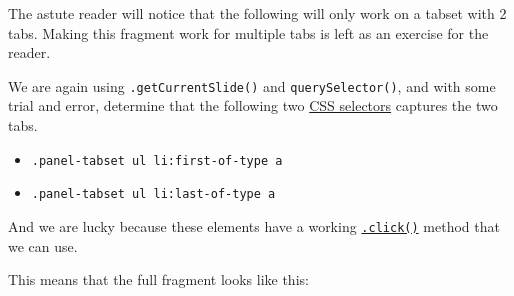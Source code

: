 \documentclass[
  letterpaper,
  DIV=11,
  numbers=noendperiod]{scrreprt}
\providecommand{\tightlist}{%
  \setlength{\itemsep}{0pt}\setlength{\parskip}{0pt}}\usepackage{longtable,booktabs,array}
\begin{document}
\begin{tcolorbox}[enhanced jigsaw, titlerule=0mm, bottomrule=.15mm, opacityback=0, colbacktitle=quarto-callout-note-color!10!white, colframe=quarto-callout-note-color-frame, coltitle=black, breakable, toprule=.15mm, colback=white, bottomtitle=1mm, title=\textcolor{quarto-callout-note-color}{\faInfo}\hspace{0.5em}{Note}, toptitle=1mm, arc=.35mm, left=2mm, leftrule=.75mm, rightrule=.15mm, opacitybacktitle=0.6]

The astute reader will notice that the following will only work on a
tabset with 2 tabs. Making this fragment work for multiple tabs is left
as an exercise for the reader.

\end{tcolorbox}

We are again using \texttt{.getCurrentSlide()} and
\texttt{querySelector()}, and with some trial and error, determine that
the following two
\href{https://www.w3schools.com/cssref/css_selectors.php}{CSS selectors}
captures the two tabs.

\begin{itemize}
\tightlist
\item
  \texttt{.panel-tabset\ ul\ li:first-of-type\ a}
\item
  \texttt{.panel-tabset\ ul\ li:last-of-type\ a}
\end{itemize}

And we are lucky because these elements have a working
\href{https://developer.mozilla.org/en-US/docs/Web/API/HTMLElement/click}{\texttt{.click()}}
method that we can use.

This means that the full fragment looks like this:
\end{document}
